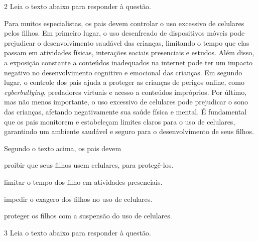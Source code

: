 \num{2} Leia o texto abaixo para responder à questão. 

\begin{myquote}

Para muitos especialistas, os pais devem controlar o uso excessivo de celulares 
pelos filhos. Em primeiro lugar, o uso desenfreado de dispositivos
móveis pode prejudicar o desenvolvimento saudável das crianças, limitando o
tempo que elas passam em atividades físicas, interações sociais presenciais e
estudos. Além disso, a exposição constante a conteúdos inadequados na internet
pode ter um impacto negativo no desenvolvimento cognitivo e emocional das
crianças. Em segundo lugar, o controle dos pais ajuda a proteger as crianças
de perigos online, como \textit{cyberbullying}, predadores virtuais e acesso a
conteúdos impróprios. Por último, mas não menos importante, o uso excessivo de
celulares pode prejudicar o sono das crianças, afetando negativamente sua
saúde física e mental. É fundamental que os pais monitorem e
estabeleçam limites claros para o uso de celulares, garantindo um ambiente
saudável e seguro para o desenvolvimento de seus filhos.


\end{myquote}

Segundo o texto acima, os pais devem   

\begin{escolha}

  \item proibir que seus filhos usem celulares, para protegê-los.
  
  \item limitar o tempo dos filho em atividades presenciais.
  
  \item impedir o exagero dos filhos no uso de celulares.
  
  \item proteger os filhos com a suspensão do uso de celulares.

\end{escolha}

\num{3} Leia o texto abaixo para responder à questão.

